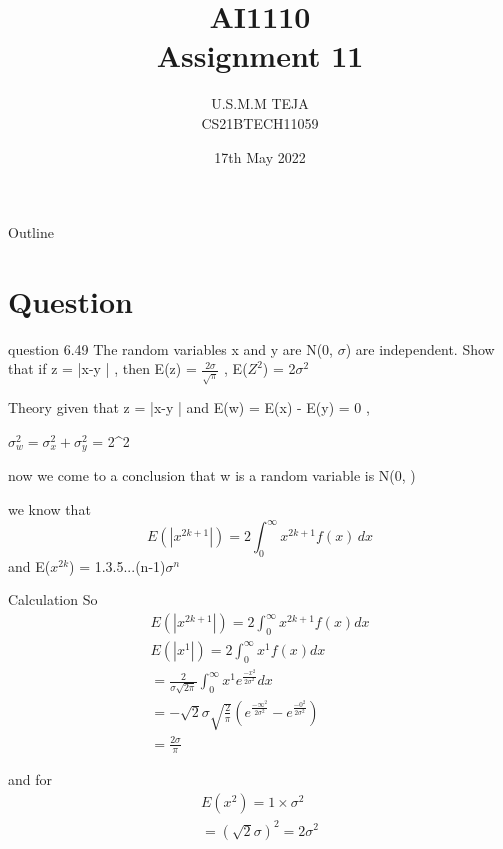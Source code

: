 \documentclass{beamer}
\title{AI1110 \\ Assignment 11}
\author{U.S.M.M TEJA \\ CS21BTECH11059}
\date{17th May 2022}
\begin{document}
	\begin{frame}
		\titlepage
	\end{frame}
	
	\begin{frame}{Outline}
    		\tableofcontents
	\end{frame}
	
	\section{Question}
	\begin{frame}{question 6.49}
The random variables x and y are N(0, $\sigma$) are independent. Show that if z = \left|x-y \right| , then E(z) = $\frac{2\sigma}{\sqrt{\pi}}$ , E($Z^2$) = 2$\sigma^2$
	\end{frame}
	
\begin{frame}{Theory}
given that z = \left|x-y \right| and E(w) = E(x) - E(y) = 0 ,

$ \sigma_w^2 = \sigma_x^2 + \sigma_y^2 $ = 2\sigma^2

now we come to a conclusion that w is a random variable is N(0, \sigma)

 we know that \[E(\left|x^{2k+1}\right|) = 2\int_{0}^{\infty} x^{2k+1}f(x) \,dx \]
and E($x^{2k}$) = 1.3.5...(n-1)$\sigma^n$
\end{frame}

    \begin{frame}{Calculation}
    So
\begin{align}
  & E(\left|x^{2k+1}\right|) = 2\int_{0}^{\infty} x^{2k+1}f(x) dx & \\  
  & E(\left|x^{1}\right|)  = 2\int_{0}^{\infty} x^{1}f(x) dx & \\
  &  = \frac{2}{\sigma\sqrt{2\pi}}\int_{0}^{\infty} x^{1}e^{\frac{-x^2}{2\sigma^2}} dx& \\
  & = -\sqrt{2}\sigma\sqrt{\frac{2}{\pi}}(e^{\frac{-\infty^2}{2\sigma^2}} - e^{\frac{-0^2}{2\sigma^2}})  & \\
  & = \frac{2\sigma}{\pi}&
\end{align}

and for 
\begin{align}
 & E(x^2) = 1\times \sigma^2&\\
 & = (\sqrt{2}\sigma)^2 = 2\sigma^2&
    \end{align}
\end{frame}
\end{document}
